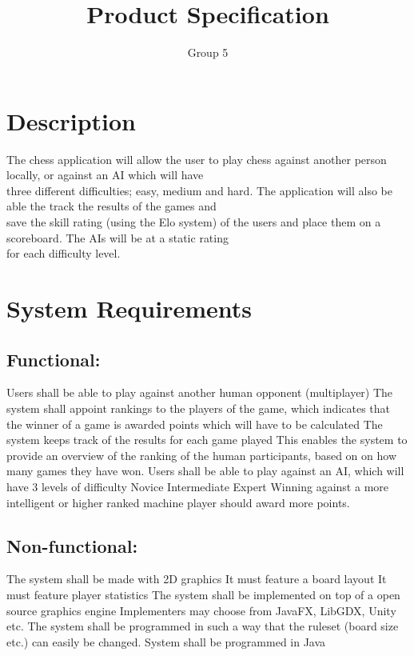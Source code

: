 \documentclass{article}
\title{Product Specification}
\author{Group 5}
\date{}
\begin{document}
    \maketitle
    
    \section{Description}
    The chess application will allow the user to play chess against another person locally, or against an AI which will have \\
    three different difficulties; easy, medium and hard. The application will also be able the track the results of the games and \\
    save the skill rating (using the Elo system) of the users and place them on a scoreboard. The AIs will be at a static rating \\
    for each difficulty level.
    
    \section{System Requirements} 
    \subsection{Functional:}
    \begin{outline}
          \1 Users shall be able to play against another human opponent (multiplayer)
          \1 The system shall appoint rankings to the players of the game, which indicates 
             that the winner of a game is awarded points which will have to be calculated
          \1 The system keeps track of the results for each game played
          \2 This enables the system to provide an overview of the ranking of the human participants,
             based on on how many games they have won.
          \1 Users shall be able to play against an AI, which will have 3 levels of difficulty
          \2 Novice
          \2 Intermediate
          \2 Expert
          \1 Winning against a more intelligent or higher ranked machine player should award more points.
     \end{outline}
     
    \subsection{Non-functional:}
    \begin{outline}
          \1 The system shall be made with 2D graphics
          \2 It must feature a board layout
          \2 It must feature player statistics
          \1 The system shall be implemented on top of a open source graphics engine
          \2 Implementers may choose from JavaFX, LibGDX, Unity etc.
          \1 The system shall be programmed in such a way that the ruleset (board size etc.) can easily be changed.
          \1 System shall be programmed in Java
    \end{outline}
    
\end{document}
